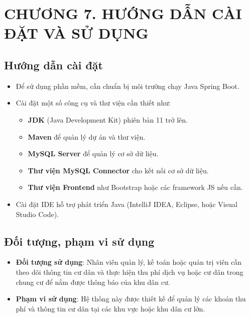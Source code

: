 \documentclass{article}
\begin{document}
\newpage

\section*{CHƯƠNG 7. HƯỚNG DẪN CÀI ĐẶT VÀ SỬ DỤNG}
\setcounter{section}{7}
\setcounter{subsection}{0}

\subsection{Hướng dẫn cài đặt}
    \begin{itemize}
        \item Để sử dụng phần mềm, cần chuẩn bị môi trường chạy Java Spring Boot.
        \item Cài đặt một số công cụ và thư viện cần thiết như:
        \begin{itemize}
            \item \textbf{JDK} (Java Development Kit) phiên bản 11 trở lên.
            \item \textbf{Maven} để quản lý dự án và thư viện.
            \item \textbf{MySQL Server} để quản lý cơ sở dữ liệu.
            \item \textbf{Thư viện MySQL Connector} cho kết nối cơ sở dữ liệu.
            \item \textbf{Thư viện Frontend} như Bootstrap hoặc các framework JS nếu cần.
        \end{itemize}
        \item Cài đặt IDE hỗ trợ phát triển Java (IntelliJ IDEA, Eclipse, hoặc Visual Studio Code).
    \end{itemize}

\subsection{Đối tượng, phạm vi sử dụng}
    \begin{itemize} 
        \item \textbf{Đối tượng sử dụng}: Nhân viên quản lý, kế toán hoặc quản trị viên cần theo dõi thông tin cư dân và thực hiện thu phí dịch vụ hoặc cư dân trong chung cư để nắm được thông báo của khu dân cư.
        \item \textbf{Phạm vi sử dụng}: Hệ thống này được thiết kế để quản lý các khoản thu phí và thông tin cư dân tại các khu vực hoặc khu dân cư lớn. 
    \end{itemize}
    
\end{document}
